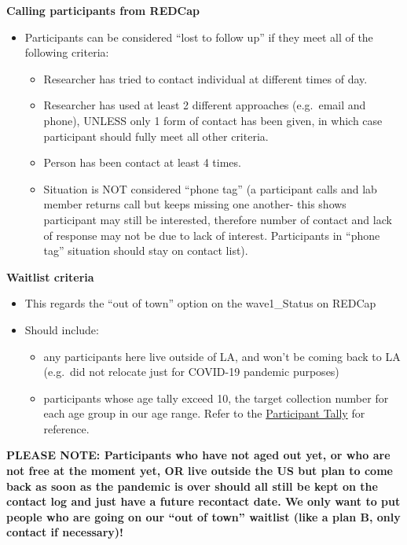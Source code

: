 \documentclass[
]{book}
\providecommand{\tightlist}{%
  \setlength{\itemsep}{0pt}\setlength{\parskip}{0pt}}
\begin{document}
\textbf{Calling participants from REDCap}

\begin{itemize}
\tightlist
\item
  Participants can be considered ``lost to follow up'' if they meet all of the following criteria:

  \begin{itemize}
  \tightlist
  \item
    Researcher has tried to contact individual at different times of day.
  \item
    Researcher has used at least 2 different approaches (e.g.~email and phone), UNLESS only 1 form of contact has been given, in which case participant should fully meet all other criteria.
  \item
    Person has been contact at least 4 times.
  \item
    Situation is NOT considered ``phone tag'' (a participant calls and lab member returns call but keeps missing one another- this shows participant may still be interested, therefore number of contact and lack of response may not be due to lack of interest. Participants in ``phone tag'' situation should stay on contact list).
  \end{itemize}
\end{itemize}

\textbf{Waitlist criteria}

\begin{itemize}
\tightlist
\item
  This regards the ``out of town'' option on the wave1\_Status on REDCap
\item
  Should include:

  \begin{itemize}
  \tightlist
  \item
    any participants here live outside of LA, and won't be coming back to LA (e.g.~did not relocate just for COVID-19 pandemic purposes)
  \item
    participants whose age tally exceed 10, the target collection number for each age group in our age range. Refer to the \href{https://ucla.app.box.com/file/724688028024}{Participant Tally} for reference.
  \end{itemize}
\end{itemize}

\textbf{PLEASE NOTE: Participants who have not aged out yet, or who are not free at the moment yet, OR live outside the US but plan to come back as soon as the pandemic is over should all still be kept on the contact log and just have a future recontact date. We only want to put people who are going on our ``out of town'' waitlist (like a plan B, only contact if necessary)!}
\end{document}
